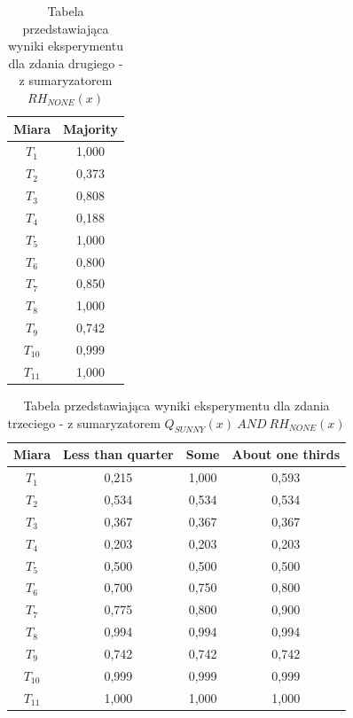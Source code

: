 \documentclass{classrep}
\begin{document}
\begin{table}[H]
	\centering
	\begin{tabular}{c c} 
		\hline
		\textbf{Miara}  & {Majority}\\ [0.5ex] 
		\hline
		\hline
$T_1$	&	1,000	\\
$T_2$	&	0,373	\\
$T_3$	&	0,808	\\
$T_4$	&	0,188	\\
$T_5$	&	1,000	\\
$T_6$	&	0,800	\\
$T_7$	&	0,850	\\
$T_8$	&	1,000	\\
$T_9$	&	0,742	\\
$T_{10}$	&	0,999	\\
$T_{11}$	&	1,000	\\
		\hline
	\end{tabular}
	\caption{Tabela przedstawiająca wyniki eksperymentu dla zdania drugiego - z sumaryzatorem ${RH}_{\textit{NONE}}(x)$}
\end{table}

\begin{table}[H]
	\centering
	\begin{tabular}{c c c c} 
		\hline
		\textbf{Miara}  & {Less than quarter} & {Some} & {About one thirds}\\ [0.5ex] 
		\hline
		\hline
$T_1$	&	0,215	&	1,000	&	0,593	\\
$T_2$	&	0,534	&	0,534	&	0,534	\\
$T_3$	&	0,367	&	0,367	&	0,367	\\
$T_4$	&	0,203	&	0,203	&	0,203	\\
$T_5$	&	0,500	&	0,500	&	0,500	\\
$T_6$	&	0,700	&	0,750	&	0,800	\\
$T_7$	&	0,775	&	0,800	&	0,900	\\
$T_8$	&	0,994	&	0,994	&	0,994	\\
$T_9$	&	0,742	&	0,742	&	0,742	\\
$T_{10}$	&	0,999	&	0,999	&	0,999	\\
$T_{11}$	&	1,000	&	1,000	&	1,000	\\
		\hline
	\end{tabular}
	\caption{Tabela przedstawiająca wyniki eksperymentu dla zdania trzeciego - z sumaryzatorem ${Q}_{\textit{SUNNY}}(x) ~AND~ {RH}_{\textit{NONE}}(x)$}
\end{table}


\clearpage
\end{document}
